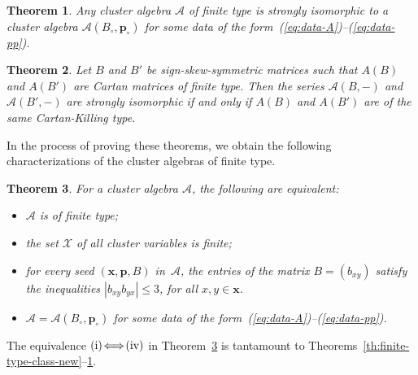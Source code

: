 \documentclass[letterpaper]{amsart}
\numberwithin{equation}{section}
\newtheorem{theorem}{Theorem}[section]
\theoremstyle{definition}
\def\AA{\mathcal{A}}
\def\xx{\mathbf{x}}
\def\pp{\mathbf{p}}
\begin{document}
\begin{theorem} 
\label{th:finite-type-class-exhaust} Any cluster algebra $\AA$ of 
finite type is strongly isomorphic to a cluster algebra 
$\AA(B_\circ,\pp_\circ)$ for some data of the 
form~{\rm(\ref{eq:data-A})--(\ref{eq:data-pp})}. 
\end{theorem} 
 
\begin{theorem} 
\label{th:series-CK} 
Let $B$ and $B'$ be sign-skew-symmetric matrices such that 
$A(B)$ and $A(B')$ are Cartan matrices of finite type. 
Then the series $\AA(B,-)$ and $\AA(B',-)$ 
are strongly isomorphic if and only if $A(B)$ and $A(B')$ 
are of the same Cartan-Killing 
type. 
\end{theorem} 
 
In the process of proving these theorems, 
we obtain the following characterizations of the 
cluster algebras of finite type. 
 
\pagebreak[3] 
 
\begin{theorem} 
\label{th:fin-type-characterizations} 
For a cluster algebra 
$\mathcal{A}$, the following are equivalent: 
\begin{itemize} 
\item[{\rm(i)}] 
$\mathcal{A}$ is of finite type; 
\item[{\rm(ii)}] 
the set $\mathcal{X}$ of all cluster variables is finite; 
\item[{\rm(iii)}] 
for every seed  $(\xx, \pp, B)$ in~$\mathcal{A}$, the entries of 
the matrix $B=(b_{xy})$ satisfy the inequalities 
$|b_{xy}b_{yx}|\leq 3$, for all $x,y\in\xx$. 
\item[{\rm(iv)}] 
$\AA = \AA(B_\circ,\pp_\circ)$ for some data of the 
form~{\rm(\ref{eq:data-A})--(\ref{eq:data-pp}).} 
\end{itemize} 
\end{theorem} 
 
The equivalence ${\rm(i)}\!\Longleftrightarrow\!{\rm(iv)}$ 
in Theorem~\ref{th:fin-type-characterizations} is tantamount to 
Theorems~\ref{th:finite-type-class-new}--\ref{th:finite-type-class-exhaust}. 
 
\end{document}
